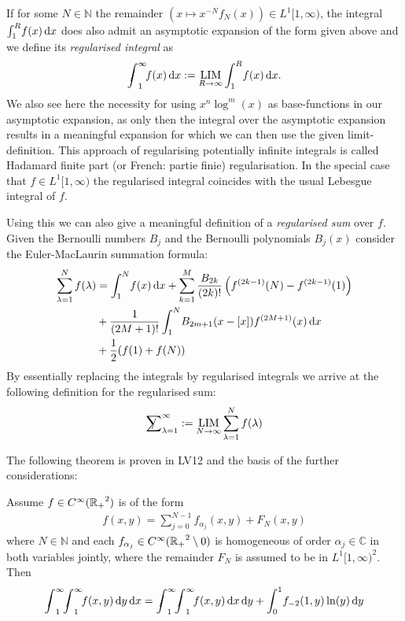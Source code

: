 If for some $N\in\mathbb{N}$ the remainder $(x\mapsto x^{-N}f_N(x))\in
L^1[1,\infty)$, the integral $\Integ[R]{1}{x}{f(x)}$ does also admit an
asymptotic expansion of the form given above and we define its \emph{regularised
integral} as
\begin{align}
  \Regint{x}{f(x)} := \Reglim_{R\to\infty}\Integ[R]{1}{x}{f(x)}.
\end{align}
We also see here the necessity for using $x^n \log^m(x)$ as base-functions in
our asymptotic expansion, as only then the integral over the asymptotic
expansion results in a meaningful expansion for which we can then use the given
limit-definition. This approach of regularising potentially infinite integrals
is called Hadamard finite part (or French: partie finie) regularisation. In the
special case that $f\in L^1[1,\infty)$ the regularised integral coincides with
the usual Lebesgue integral of $f$.

Using this we can also give a meaningful definition of a \emph{regularised sum}
over $f$. Given the Bernoulli numbers $B_j$ and the Bernoulli polynomials
$B_j(x)$ consider the Euler-MacLaurin summation formula:
\begin{align*}
  \sum_{\lambda=1}^N f(\lambda) &= \Integ[N]{1}{x}{f(x)}
  + \sum_{k=1}^M \frac{B_{2k}}{(2k)!}\left(f^{(2k-1)}(N) - f^{(2k-1)}(1)\right)
  \\
  &\mathbin{+} \frac1{(2M + 1)!}\Integ[N]{1}{x}{B_{2m+1}(x-[x])f^{(2M+1)}(x)}
  \\
  &\mathbin{+} \frac12(f(1)+f(N))
\end{align*}
By essentially replacing the integrals by regularised integrals we arrive at the
following definition for the regularised sum:
\begin{align*}
  \Regsum_{\lambda=1}^\infty := \Reglim_{N\to\infty} \sum_{\lambda=1}^N
  f(\lambda)
\end{align*}

The following theorem is proven in LV12 and the basis of the further
considerations:
\begin{Theorem}
  Assume $f\in\Cinf(\Rplus^2)$ is of the form
  \begin{align*}
    f(x,y) = \sum_{j=0}^{N-1} f_{\alpha_j}(x,y) + F_N(x,y)
  \end{align*}
  where $N\in\mathbb{N}$ and each $f_{\alpha_j}\in\Cinf(\Rplus^2\setminus{0})$
  is homogeneous of order $\alpha_j\in\mathbb{C}$ in both variables jointly,
  where the remainder $F_N$ is assumed to be in $L^1[1,\infty)^2$. Then
  \begin{align}
    \Regint{x}{\Regint{y}{f(x,y)}} =
    \Regint{y}{\Regint{x}{f(x,y)}} + \Int{y}{f_{-2}(1,y)\ln(y)}
  \end{align}
\end{Theorem}

